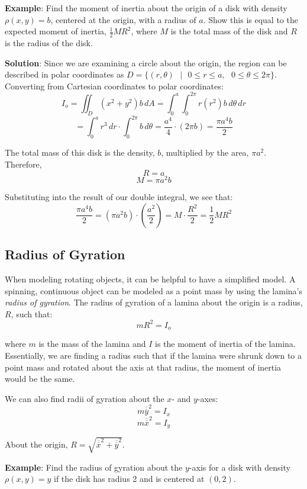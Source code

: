 \textbf{Example}: Find the moment of inertia about the origin of a disk with 
density $\rho(x, y) = b$, centered at the origin, with a radius of $a$. Show 
this is equal to the expected moment of inertia, $\frac{1}{2}MR^2$, where $M$ 
is the total mass of the disk and $R$ is the radius of the disk.

\textbf{Solution}: Since we are examining a circle about the origin, the 
region can be described in polar coordinates as $\textit{D} = \{(r, \theta)
\text{ }|\text{ } 0 \leq r \leq a, \text{ }0 \leq \theta \leq 2\pi \}$. 
Converting from Cartesian coordinates to polar coordinates:
$$I_o = \iint_{\textit{D}} \left(x ^2 + y^2 \right) b\,dA = \int_0^a \int_0^{2
\pi} r \left( r^2 \right) b\,d\theta \,d r$$
$$= \int_0^a r^3\,dr \cdot \int_0^{2\pi}b \,d\theta = \frac{a^4}{4} \cdot 
\left(2\pi b \right) = \frac{\pi a^4 b}{2}$$

The total mass of this disk is the density, $b$, multiplied by the area, $\pi 
a^2$. Therefore,
$$R = a$$
$$M = \pi a^2 b$$

Substituting into the result of our double integral, we see that:
$$\frac{\pi a^4 b}{2} = \left( \pi a^2 b \right) \cdot \left( \frac{a^2}{2} 
\right) = M \cdot \frac{R^2}{2} = \frac{1}{2}MR^2$$

\subsection{Radius of Gyration}
When modeling rotating objects, it can be helpful to have a simplified model. 
A spinning, continuous object can be modeled as a point mass by using the 
lamina's \textit{radius of gyration}. The radius of 
gyration of a lamina about the origin is a radius, $R$, such that:
$$mR^2 = I_o$$

where $m$ is the mass of the lamina and $I$ is the moment of inertia of the 
lamina. Essentially, we are finding a radius such that if the lamina were 
shrunk down to a point mass and rotated about the axis at that radius, the 
moment of inertia would be the same. 

We can also find radii of gyration about the $x$- and $y$-axes:
$$m \overline{\overline{y}}^2 = I_{x}$$
$$m \overline{\overline{x}}^2 = I_{y}$$

About the origin, $R = \sqrt{ \overline{\overline{x}}^2 + \overline{\overline{y}}^2}$. 

\textbf{Example}: Find the radius of gyration about the $y$-axis for a disk 
with density $\rho(x, y) = y$ if the disk has radius 2 and is centered at $(0, 
2)$. 

